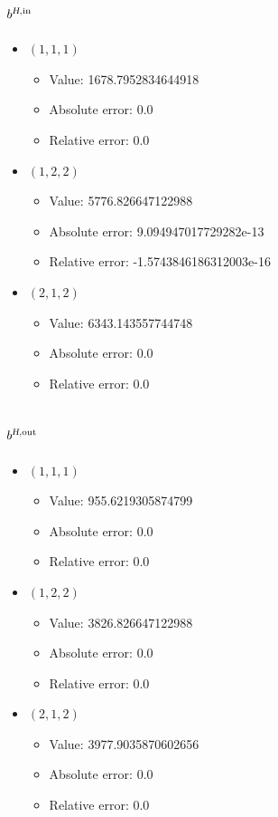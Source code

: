 \documentclass{article}%
\begin{document}
\subsection{$b^{\textsl{H},\text{in}}$}%
\begin{itemize}%
	\item $(1, 1, 1)$%
	\begin{itemize}%
		\item Value: 1678.7952834644918%
		\item Absolute error: 0.0%
		\item Relative error: 0.0%
	\end{itemize}%
	\item $(1, 2, 2)$%
	\begin{itemize}%
		\item Value: 5776.826647122988%
		\item Absolute error: 9.094947017729282e-13%
		\item Relative error: -1.5743846186312003e-16%
	\end{itemize}%
	\item $(2, 1, 2)$%
	\begin{itemize}%
		\item Value: 6343.143557744748%
		\item Absolute error: 0.0%
		\item Relative error: 0.0%
	\end{itemize}%
\end{itemize}%
\subsection{$b^{\textsl{H},\text{out}}$}%
\begin{itemize}%
	\item $(1, 1, 1)$%
	\begin{itemize}%
		\item Value: 955.6219305874799%
		\item Absolute error: 0.0%
		\item Relative error: 0.0%
	\end{itemize}%
	\item $(1, 2, 2)$%
	\begin{itemize}%
		\item Value: 3826.826647122988%
		\item Absolute error: 0.0%
		\item Relative error: 0.0%
	\end{itemize}%
	\item $(2, 1, 2)$%
	\begin{itemize}%
		\item Value: 3977.9035870602656%
		\item Absolute error: 0.0%
		\item Relative error: 0.0%
	\end{itemize}%
\end{itemize}%
\end{document}

